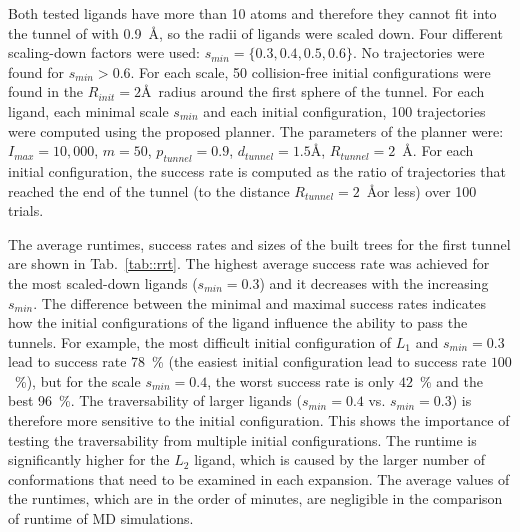 \documentclass[letterpaper, 10 pt, conference]{ieeeconf} %
\def\dt{d_{tunnel}}
\def\RI{R_{init}}
\def\rv{R_{tunnel}}
\def\Imax{I_{max}} %
\def\smin{s_{min}}
\def\gb{p_{tunnel}}
\def\L{L}
\def\LA{L_1}
\def\LB{L_2}
\begin{document}
Both tested ligands have more than 10 atoms and therefore they cannot fit into the tunnel of with 0.9~\AA, so
the radii of ligands were scaled down. 
Four different scaling-down factors were used: $\smin=\{0.3,0.4,0.5,0.6\}$.
No trajectories were found for $\smin > 0.6$.
For each scale, 50 collision-free initial configurations were found in the $\RI=2$\AA\ radius around the first sphere of the tunnel.
For each ligand, each minimal scale $\smin$ and each initial configuration, 100 trajectories were computed using the proposed planner.
The parameters of the planner were: $\Imax=10,000$, $m=50$, $\gb=0.9$, $\dt=1.5$\AA, $\rv=2$~\AA.
For each initial configuration, the success rate is computed as the ratio of trajectories that reached the end of the tunnel (to the distance 
 $\rv=2$~\AA or less) over 100 trials.

The average runtimes, success rates and sizes of the built trees for the first tunnel are shown in Tab.~\ref{tab::rrt}.
The highest average success rate was achieved for the most scaled-down ligands ($\smin=0.3$) and it decreases with the increasing $\smin$. 
The difference between the minimal and maximal success rates indicates how the initial configurations of the ligand influence the ability to pass the tunnels.
For example, the most difficult initial configuration of $\LA$ and $\smin=0.3$ lead to success rate 78~\% (the easiest 
        initial configuration lead to success rate $100$~\%), but for the scale $\smin=0.4$, the worst success rate is
only $42$~\% and the best 96~\%.
The traversability of larger ligands ($\smin=0.4$ vs. $\smin=0.3$) is therefore more sensitive to the initial configuration.
This shows the importance of testing the traversability from multiple initial configurations.
The runtime is significantly higher for the $\LB$ ligand, which is caused by the larger number of conformations that need to be
examined in each expansion.
The average values of the runtimes, which are in the order of minutes, are negligible in the comparison of runtime of MD simulations.



\def\tmpa{0.13\textwidth}
\end{document}
